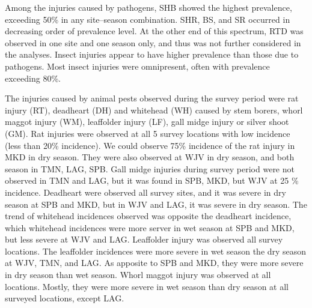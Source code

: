 
 Among the injuries caused by pathogens, SHB showed the highest prevalence, exceeding 50\% in any site–season combination. SHR, BS, and SR occurred in decreasing order of prevalence level. At the other end of this spectrum, RTD was observed in one site and one season only, and thus was not further considered in the analyses. Insect injuries appear to have higher prevalence than those due to pathogens. Most insect injuries were omnipresent, often with prevalence exceeding 80\%.

The injuries caused by animal pests observed during the survey period were rat injury (RT), deadheart (DH) and whitehead (WH) caused by stem borers, whorl maggot injury (WM), leaffolder injury (LF), gall midge injury or silver shoot (GM). Rat injuries were observed at all 5 survey locations with low incidence (less than 20\% incidence). We could observe 75\% incidence of the rat injury in MKD in dry season. They were also observed at WJV in dry season, and both season in TMN, LAG, SPB. Gall midge injuries during survey period were not observed in TMN and LAG, but it was found in SPB, MKD, but WJV at 25 \% incidence. Deadheart were observed all survey sites, and it was severe in dry season at SPB and MKD, but in WJV and LAG, it was severe in dry season. The trend of whitehead incidences observed was opposite the deadheart incidence, which whitehead incidences were more server in wet season at SPB and MKD, but less severe at WJV and LAG. Leaffolder injury was observed all survey locations. The leaffolder incidences were more severe in wet season the dry season at WJV, TMN, and LAG. As apposite to SPB and MKD, they were more severe in dry season than wet season. Whorl maggot injury was observed at all locations. Mostly, they were more severe in wet season than dry season at all surveyed locations, except LAG.

